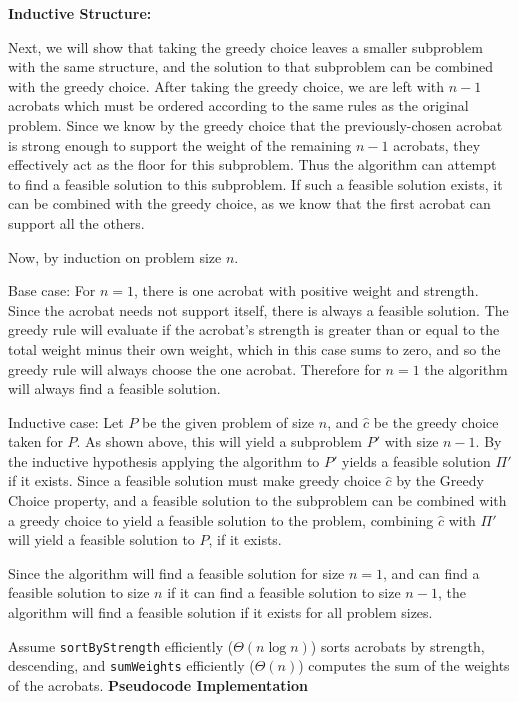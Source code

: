 \documentclass[11pt]{article}
\begin{document}
\textbf{Inductive Structure: }

Next, we will show that taking the greedy choice leaves a smaller subproblem with the same structure, and the solution to that subproblem can be combined with the greedy choice. After taking the greedy choice, we are left with $n-1$ acrobats which must be ordered according to the same rules as the original problem. Since we know by the greedy choice that the previously-chosen acrobat is strong enough to support the weight of the remaining $n-1$ acrobats, they effectively act as the floor for this subproblem. Thus the algorithm can attempt to find a feasible solution to this subproblem. If such a feasible solution exists, it can be combined with the greedy choice, as we know that the first acrobat can support all the others.

Now, by induction on problem size $n$. 

Base case: For $n=1$, there is one acrobat with positive weight and strength. Since the acrobat needs not support itself, there is always a feasible solution. The greedy rule will evaluate if the acrobat's strength is greater than or equal to the total weight minus their own weight, which in this case sums to zero, and so the greedy rule will always choose the one acrobat. Therefore for $n=1$ the algorithm will always find a feasible solution.

Inductive case: Let $P$ be the given problem of size $n$, and $\hat{c}$ be the greedy choice taken for $P$. As shown above, this will yield a subproblem $P'$ with size $n-1$. By the inductive hypothesis applying the algorithm to $P'$ yields a feasible solution $\Pi'$ if it exists. Since a feasible solution must make greedy choice $\hat{c}$ by the Greedy Choice property, and a feasible solution to the subproblem can be combined with a greedy choice to yield a feasible solution to the problem, combining $\hat{c}$ with $\Pi'$ will yield a feasible solution to $P$, if it exists. 

Since the algorithm will find a feasible solution for size $n=1$, and can find a feasible solution to size $n$ if it can find a feasible solution to size $n-1$, the algorithm will find a feasible solution if it exists for all problem sizes.

Assume \texttt{sortByStrength} efficiently ($\Theta(n\log n)$) sorts acrobats by strength, descending, and \texttt{sumWeights} efficiently ($\Theta(n)$) computes the sum of the weights of the acrobats.
\textbf{Pseudocode Implementation}
\end{document}
